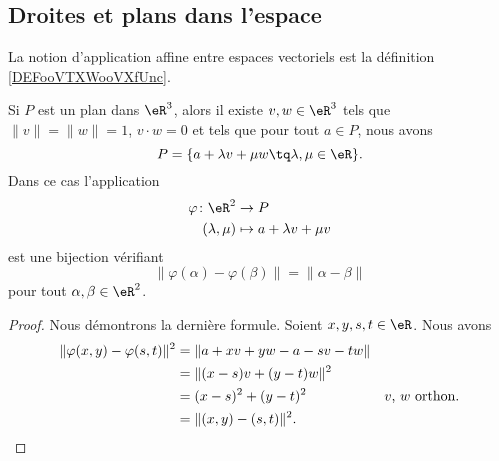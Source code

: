 \subsection{Droites et plans dans l'espace}

La notion d'application affine entre espaces vectoriels est la définition \ref{DEFooVTXWooVXfUnc}.

\begin{proposition}	\label{PROPooONJHooDArmPT}
	Si \( P\) est un plan dans \( \eR^3\), alors il existe \( v,w\in \eR^3\) tels que \( \| v \|=\| w \|=1\), \( v\cdot w=0\) et tels que pour tout \( a\in P\), nous avons
	\begin{equation}
		P=\{ a+\lambda v+\mu w\tq \lambda,\mu\in \eR \}.
	\end{equation}
	Dans ce cas l'application
	\begin{equation}
		\begin{aligned}
			\varphi\colon \eR^2 & \to P                     \\
			(\lambda,\mu)       & \mapsto a+\lambda v+\mu v
		\end{aligned}
	\end{equation}
	est une bijection vérifiant
	\begin{equation}
		\| \varphi(\alpha)-\varphi(\beta) \|=\| \alpha-\beta \|
	\end{equation}
	pour tout \( \alpha,\beta\in \eR^2\).
\end{proposition}

\begin{proof}
	Nous démontrons la dernière formule. Soient \( x,y,s,t\in \eR\). Nous avons
	\begin{subequations}
		\begin{align}
			\| \varphi(x,y)-\varphi(s,t) \|^2 & =\| a+xv+yw-a-sv-tw \|                                 \\
			                                  & =\| (x-s)v+(y-t)w \|^2                                 \\
			                                  & =(x-s)^2+(y-t)^2       & \text{\( v\), \( w\) orthon.} \\
			                                  & =\| (x,y)-(s,t) \|^2.
		\end{align}
	\end{subequations}
\end{proof}

